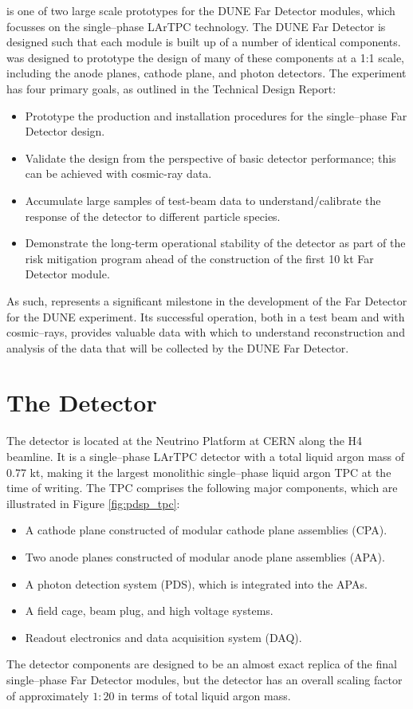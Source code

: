 \bigskip\noindent
\protodune{} is one of two large scale prototypes for the DUNE Far Detector
modules, which focusses on the single--phase LArTPC technology. The DUNE Far
Detector is designed such that each module is built up of a number of 
identical components. \protodune{} was designed to prototype the design of 
many of these components at a 1:1 scale, including the anode planes, cathode 
plane, and photon detectors. The \protodune{} experiment has four primary 
goals, as outlined in the Technical Design Report\cite{Abi:2017aow}:
\begin{itemize}
	\item Prototype the production and installation procedures for the
		single--phase Far Detector design.
	\item Validate the design from the perspective of basic detector performance; this can be achieved with cosmic-ray data. 
	\item Accumulate large samples of test-beam data to understand/calibrate the
		response of the detector to different particle species.
	\item Demonstrate the long-term operational stability of the detector as part
		of the risk mitigation program ahead of the construction of the first 10 kt
		Far Detector module.
\end{itemize}
As such, \protodune{} represents a significant milestone in the development of
the Far Detector for the DUNE experiment. Its successful operation, both in a 
test beam and with cosmic--rays, provides valuable data with which to understand
reconstruction and analysis of the data that will be collected by the DUNE Far 
Detector.

\section{The \protodune{} Detector} \label{sec:pdsp_detector}

The \protodune{} detector is located at the Neutrino Platform at CERN along the
H4 beamline. It is a single--phase LArTPC detector with a total liquid argon 
mass of 0.77 kt, making it the largest monolithic single--phase liquid argon TPC
at the time of writing. The TPC comprises the following major components, which 
are illustrated in Figure \ref{fig:pdsp_tpc}:
\begin{itemize}
	\item A cathode plane constructed of modular cathode plane assemblies (CPA).
	\item Two anode planes constructed of modular anode plane assemblies (APA).
	\item A photon detection system (PDS), which is integrated into the APAs.
	\item A field cage, beam plug, and high voltage systems.
	\item Readout electronics and data acquisition system (DAQ).
\end{itemize}
The detector components are designed to be an almost exact replica of the final 
single--phase Far Detector modules, but the detector has an overall scaling 
factor of approximately $1:20$ in terms of total liquid argon 
mass\cite{Abi:2017aow}.

